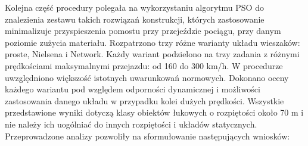 Kolejna część procedury polegała na wykorzystaniu algorytmu PSO do znalezienia zestawu takich rozwiązań konstrukcji, których zastosowanie minimalizuje przyspieszenia pomostu przy przejeździe pociągu, przy danym poziomie zużycia materiału. Rozpatrzono trzy różne warianty układu wieszaków: proste, Nielsena i Network. Każdy wariant podzielono na trzy zadania z różnymi prędkościami maksymalnymi przejazdu: od 160 do 300 km/h. W procedurze uwzględniono większość istotnych uwarunkowań normowych.
Dokonano oceny każdego wariantu pod względem odporności dynamicznej i możliwości zastosowania danego układu w przypadku kolei dużych prędkości. Wszystkie przedstawione wyniki dotyczą klasy obiektów łukowych o rozpiętości około 70 m i nie należy ich uogólniać do innych rozpiętości i układów statycznych. Przeprowadzone analizy pozwoliły na sformułowanie następujących wniosków:
